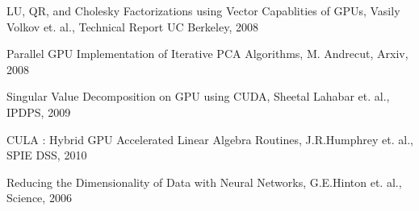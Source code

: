 \documentclass[submit]{aiaa-tc_mod}%
\begin{document}
\begin{thebibliography}{20}
LU, QR, and Cholesky Factorizations using Vector Capablities of GPUs, 
Vasily Volkov et. al., 
Technical Report UC Berkeley, 
2008

Parallel GPU Implementation of Iterative PCA Algorithms, 
M. Andrecut, 
Arxiv, 
2008

Singular Value Decomposition on GPU using CUDA, 
Sheetal Lahabar et. al., 
IPDPS, 
2009

CULA : Hybrid GPU Accelerated Linear Algebra Routines,
J.R.Humphrey et. al., 
SPIE DSS, 
2010

Reducing the Dimensionality of Data with Neural Networks, 
G.E.Hinton et. al., 
Science, 
2006
 
\end{thebibliography}
\end{document}
